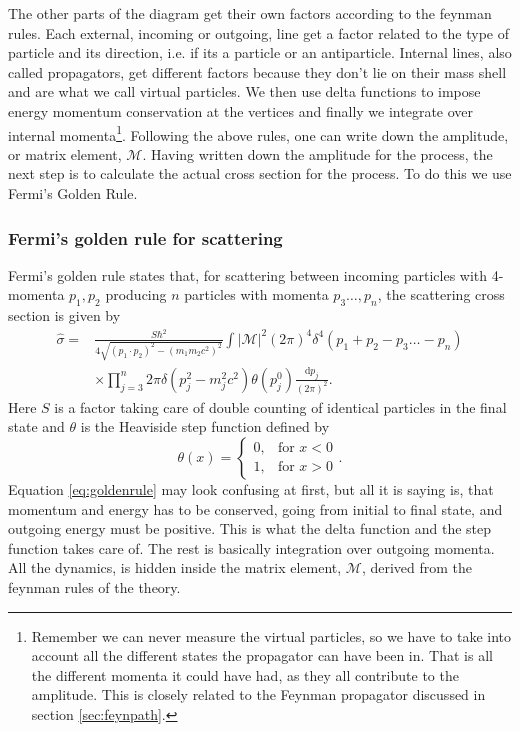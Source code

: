 The other parts of the diagram get their own factors according to the feynman rules. Each external, incoming or outgoing, line get a factor related to the type of particle and its direction, i.e. if its a particle or an antiparticle. Internal lines, also called propagators, get different factors because they don't lie on their mass shell and are what we call virtual particles. We then use delta functions to impose energy momentum conservation at the vertices and finally we integrate over internal momenta\footnote{Remember we can never measure the virtual particles, so we have to take into account all the different states the propagator can have been in. That is all the different momenta it could have had, as they all contribute to the amplitude. This is closely related to the Feynman propagator discussed in section \ref{sec:feynpath}.}. Following the above rules, one can write down the amplitude, or matrix element, $\mathcal{M}$. Having written down the amplitude for the process, the next step is to calculate the actual cross section for the process. To do this we use Fermi's Golden Rule.
% 
\subsubsection{Fermi's golden rule for scattering}
Fermi's golden rule states that, for scattering between incoming particles with 4-momenta $p_1, p_2$ producing $n$ particles with momenta $p_3 \dots , p_n$, the scattering cross section is given by \cite{griffiths1987iep}
\begin{align} \label{eq:goldenrule}
	\hat \sigma = &\frac{S\hbar^2}{4\sqrt{(p_1 \cdot p_2)^2 - (m_1 m_2 c^2)^2}} \int |\mathcal{M}|^2 (2 \pi)^4 \delta^4(p_1+p_2-p_3 \dots -p_n) \nonumber \\
	&\times \prod_{j=3}^n 2\pi \delta(p_j^2 - m_j^2c^2)\theta(p_j^0) \frac{\textrm{d}p_j}{(2\pi)^2}.
\end{align}
Here $S$ is a factor taking care of double counting of identical particles in the final state and $\theta$ is the Heaviside step function defined by
\begin{equation}
	 \theta(x) = 
	\begin{cases} 
	  0,  & \mbox{for }x < 0 \\
	  1,  & \mbox{for }x > 0 
	\end{cases}.
\end{equation}
Equation \eqref{eq:goldenrule} may look confusing at first, but all it is saying is, that momentum and energy has to be conserved, going from initial to final state, and outgoing energy must be positive. This is what the delta function and the step function takes care of. The rest is basically integration over outgoing momenta. All the dynamics, is hidden inside the matrix element, $\mathcal{M}$, derived from the feynman rules of the theory.

